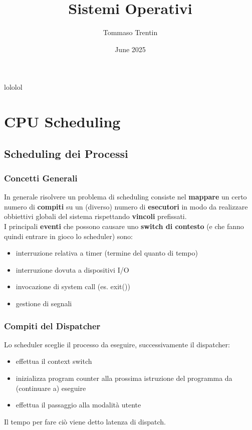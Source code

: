 \documentclass{article}
\title{Sistemi Operativi}
\author{Tommaso Trentin}
\date{June 2025}
\begin{document}
\newpage
\tableofcontents
\newpage
lololol
\section{CPU Scheduling}
\subsection{Scheduling dei Processi}
\subsubsection{Concetti Generali}
In generale risolvere un problema di scheduling consiste nel \textbf{mappare} un certo numero di \textbf{compiti} su un (diverso) numero di \textbf{esecutori} in modo da realizzare obbiettivi globali del sistema rispettando \textbf{vincoli} prefissati. \\
I principali \textbf{eventi} che possono causare uno \textbf{switch di contesto} (e che fanno quindi entrare in gioco lo scheduler) sono:
\begin{itemize}
  \item interruzione relativa a timer (termine del quanto di tempo)
  \item interruzione dovuta a dispositivi I/O
  \item invocazione di system call (es. exit())
  \item gestione di segnali
\end{itemize}
\subsubsection{Compiti del Dispatcher}
Lo scheduler sceglie il processo da eseguire, successivamente il dispatcher:
\begin{itemize}
    \item effettua il context switch
    \item inizializza program counter alla prossima istruzione del programma da (continuare a) eseguire
    \item effettua il passaggio alla modalità utente
\end{itemize}
Il tempo per fare ciò viene detto latenza di dispatch.
\end{document}
